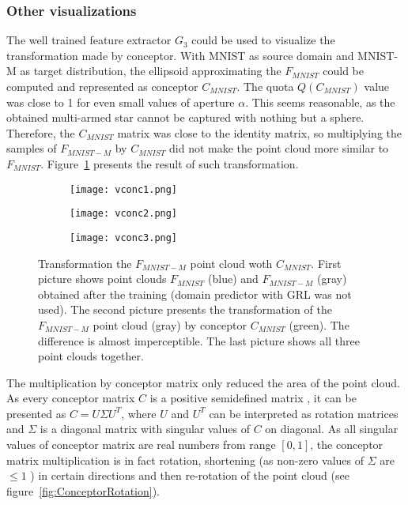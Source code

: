 \documentclass{article}
\begin{document}
\subsubsection{Other visualizations}
The well trained feature extractor $G_{3}$ could be used to visualize the transformation made by conceptor. With MNIST as source domain and MNIST-M as target distribution, the ellipsoid approximating the $F_{MNIST}$ could be computed and represented as conceptor $C_{MNIST}$. The quota $Q(C_{MNIST})$ value was close to 1 for even small values of aperture $\alpha$. This seems reasonable, as the obtained multi-armed star cannot be captured with nothing but a sphere. Therefore, the $C_{MNIST}$ matrix was close to the identity matrix, so multiplying the samples of $F_{MNIST-M}$ by $C_{MNIST}$ did not make the point cloud more similar to $F_{MNIST}$. Figure~\ref{fig:vconc} presents the result of such transformation.
\begin{figure}[H]%
    \centering
    
    \begin{subfigure}[b]{0.27\textwidth}
        \texttt{[image: vconc1.png]}
    \end{subfigure}%
    \begin{subfigure}[b]{0.27\textwidth}
        \texttt{[image: vconc2.png]}
    \end{subfigure}%
    \begin{subfigure}[b]{0.27\textwidth}
        \texttt{[image: vconc3.png]}
    \end{subfigure}%

    \caption{Transformation the $F_{MNIST-M}$ point cloud woth $C_{MNIST}$. First picture shows point clouds $F_{MNIST}$ (blue) and $F_{MNIST-M}$ (gray) obtained after the training (domain predictor with GRL was not used). The second picture presents the transformation of the $F_{MNIST-M}$ point cloud (gray) by conceptor $C_{MNIST}$ (green). The difference is almost imperceptible. The last picture shows all three point clouds together.}%
    \label{fig:vconc}%
\end{figure}
\par
The multiplication by conceptor matrix only reduced the area of the point cloud. As every conceptor matrix $C$ is a positive semidefined matrix \cite{conc}, it can be presented as $C = U\Sigma U^{T}$, where $U$ and $U^{T}$ can be interpreted as rotation matrices and $\Sigma$ is a diagonal matrix with singular values of $C$ on diagonal. As all singular values of conceptor matrix are real numbers from range $[0,1]$, the conceptor matrix multiplication is in fact rotation, shortening (as non-zero values of $\Sigma$ are $\leq 1$ \cite{conc}) in certain directions and then re-rotation of the point cloud (see figure~\ref{fig:ConceptorRotation}).
\end{document}
